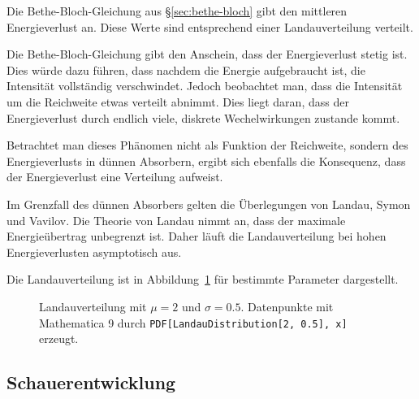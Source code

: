 \documentclass[11pt, ngerman, fleqn, DIV=15, headinclude, BCOR=2cm]{scrreprt}
\begin{document}
Die Bethe-Bloch-Gleichung aus §\ref{sec:bethe-bloch} gibt den mittleren
Energieverlust an. Diese Werte sind entsprechend einer Landauverteilung
verteilt. \parencite[44]{Grupen/Astroteilchenphysik}

Die Bethe-Bloch-Gleichung gibt den Anschein, dass der Energieverlust stetig
ist. Dies würde dazu führen, dass nachdem die Energie aufgebraucht ist, die
Intensität vollständig verschwindet. Jedoch beobachtet man, dass die Intensität
um die Reichweite etwas verteilt abnimmt. Dies liegt daran, dass der
Energieverlust durch endlich viele, diskrete Wechelwirkungen zustande kommt.
\parencite[§2.2.9]{Leo/Techniques_Nuclear_Experiments}

Betrachtet man dieses Phänomen nicht als Funktion der Reichweite, sondern des
Energieverlusts in dünnen Absorbern, ergibt sich ebenfalls die Konsequenz, dass
der Energieverlust eine Verteilung aufweist.
\parencite[§2.6]{Leo/Techniques_Nuclear_Experiments}

Im Grenzfall des dünnen Absorbers gelten die Überlegungen von Landau, Symon und
Vavilov. Die Theorie von Landau nimmt an, dass der maximale Energieübertrag
unbegrenzt ist. Daher läuft die Landauverteilung bei hohen Energieverlusten
asymptotisch aus. \parencite[§2.6.3]{Leo/Techniques_Nuclear_Experiments}

Die Landauverteilung ist in Abbildung~\ref{fig:landau-plot} für bestimmte
Parameter dargestellt.

\begin{figure}[htbp]
    \centering
    \caption{%
        Landauverteilung mit $\mu = \num{2}$ und $\sigma = \num{0.5}$.
        Datenpunkte mit Mathematica 9 durch \texttt{PDF[LandauDistribution[2,
        0.5], x]} erzeugt.
    }
    \label{fig:landau-plot}
\end{figure}

\subsection{Schauerentwicklung}
\end{document}
